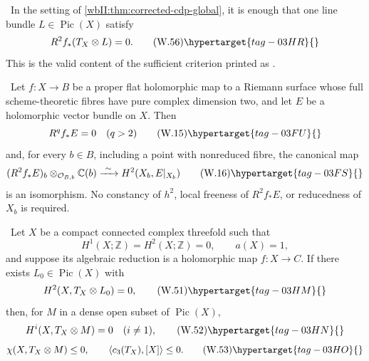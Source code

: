 \begin{corollary}\hypertarget{tag-03DT}{}\label{wbII:cor:corrected-cdp-relative}

\label{wbII:cor:relative}
\ In the setting of
\cref{wbII:thm:corrected-cdp-global}, it is enough that one line bundle
\(L\in\operatorname{Pic}(X)\) satisfy
\[
 R^2f_*(T_X\otimes L)=0.
\tag{W.56}\hypertarget{tag-03HR}{}\label{wbII:eq:W:5.29}
\]
This is the valid content of the sufficient criterion printed as
\cite[Proposition~2.4, p.~680]{CDP20}.
\end{corollary}

\begin{corollary}
\hypertarget{tag-03DV}{}\label{wbII:cor:surface-top-base-change}


\ Let $f:X\to B$ be a proper flat holomorphic map to a Riemann
surface whose full scheme-theoretic fibres have pure complex dimension two,
and let $E$ be a holomorphic vector bundle on $X$.  Then
\[
 R^qf_*E=0\quad(q>2)
 \tag{W.15}\hypertarget{tag-03FU}{}\label{wbII:eq:W:5.17-V}
\]
and, for every $b\in B$, including a point with nonreduced fibre, the
canonical map
\[
 (R^2f_*E)_b\otimes_{\mathcal O_{B,b}}\mathbb C(b)
 \xrightarrow{\ \sim\ }H^2(X_b,E|_{X_b})
 \tag{W.16}\hypertarget{tag-03FS}{}\label{wbII:eq:W:5.17-T}
\]
is an isomorphism.  No constancy of $h^2$, local freeness of $R^2f_*E$, or
reducedness of $X_b$ is required.
\end{corollary}

\begin{theorem}
\hypertarget{tag-03J0}{}\label{wbII:thm:corrected-cdp-global}

\label{wbII:thm:corrected-global}
\ Let \(X\) be a compact connected complex threefold such that
\[
 H^1(X;\mathbb Z)=H^2(X;\mathbb Z)=0,\qquad a(X)=1,
\]
and suppose its algebraic reduction is a holomorphic map
\(f:X\to C\).  If there exists \(L_0\in\operatorname{Pic}(X)\) with
\[
 H^2(X,T_X\otimes L_0)=0,
\tag{W.51}\hypertarget{tag-03HM}{}\label{wbII:eq:W:5.24}
\]
then, for \(M\) in a dense open subset of \(\operatorname{Pic}(X)\),
\[
 H^i(X,T_X\otimes M)=0\quad(i\ne1),
\tag{W.52}\hypertarget{tag-03HN}{}\label{wbII:eq:W:5.25}
\]
\[
 \chi(X,T_X\otimes M)\le0,\qquad
 \left\langle c_3(T_X),[X]\right\rangle\le0.
\tag{W.53}\hypertarget{tag-03HO}{}\label{wbII:eq:W:5.26}
\]
\end{theorem}

